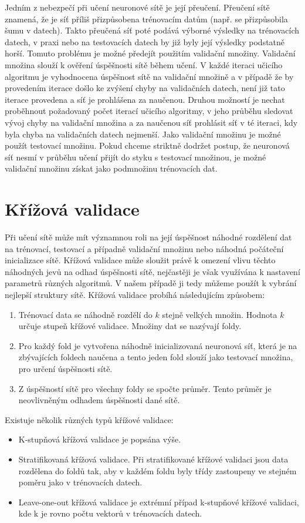 \documentclass[11pt,twoside,a4paper]{book}
\begin{document}
Jedním z nebezpečí při učení neuronové sítě je její přeučení. Přeučení sítě znamená, že je síť příliš přizpůsobena trénovacím datům (např. se přizpůsobila šumu v datech). Takto přeučená síť poté podává výborné výsledky na trénovacích datech, v praxi nebo na testovacích datech by již byly její výsledky podstatně horší. Tomuto problému je možné předejít použitím validační množiny. Validační množina slouží k ověření úspěšnosti sítě během učení. V každé iteraci učicího algoritmu je vyhodnocena úspěšnost sítě na validační množině a v případě že by provedením iterace došlo ke zvýšení chyby na validačních datech, není již tato iterace provedena a síť je prohlášena za naučenou. Druhou možností je nechat proběhnout požadovaný počet iterací učicího algoritmy, v jeho průběhu sledovat vývoj chyby na validační množina a za naučenou síť prohlásit síť v té iteraci, kdy byla chyba na validačních datech nejmenší.
Jako validační množinu je možné použít testovací množinu. Pokud chceme striktně dodržet postup, že neuronová síť nesmí v průběhu učení přijít do styku s testovací množinou, je možné validační množinu získat jako podmnožinu trénovacích dat.
\section{Křížová validace}
Při učení sítě může mít významnou roli na její úspěšnost náhodné rozdělení dat na trénovací, testovací a případně validační množinu nebo náhodná počáteční inicializace sítě.
Křížová validace může sloužit právě k omezení vlivu těchto náhodných jevů na odhad úspěšnosti sítě, nejčastěji je však využívána k nastavení parametrů různých algoritmů. V našem případě ji tedy můžeme použít k vybrání nejlepší struktury sítě. Křížová validace probíhá následujícím způsobem:
\begin{enumerate}
\item Trénovací data se náhodně rozdělí do $k$ stejně velkých množin. Hodnota $k$ určuje stupeň křížové validace. Množiny dat se nazývají foldy.
\item Pro každý fold je vytvořena náhodně inicializovaná neuronová síť, která je na zbývajících foldech naučena a tento jeden fold slouží jako testovací množina, pro určení úspěšnosti sítě.
\item Z úspěšností sítě pro všechny foldy se spočte průměr. Tento průměr je neovlivněným odhadem úspěšnosti dané sítě.
\end{enumerate}
Existuje několik různých typů křížové validace:
\begin{itemize}
\item K-stupňová křížová validace je popsána výše.
\item Stratifikovaná křížová validace. Při stratifikované křížové validaci jsou data rozdělena do foldů tak, aby v každém foldu byly třídy zastoupeny ve stejném poměru jako v trénovacích datech.
\item Leave-one-out křížová validace je extrémní případ k-stupňové křížové validaci, kde k je rovno počtu vektorů v trénovacích datech.
\end{itemize}
\end{document}
